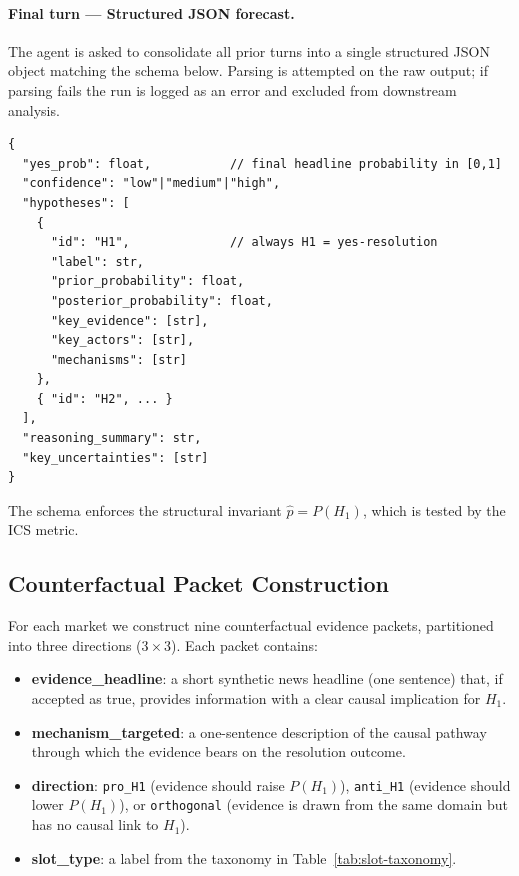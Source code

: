 \paragraph{Final turn --- Structured JSON forecast.}
The agent is asked to consolidate all prior turns into a single structured JSON object matching
the schema below.  Parsing is attempted on the raw output; if parsing fails the run is logged
as an error and excluded from downstream analysis.

\begin{verbatim}
{
  "yes_prob": float,           // final headline probability in [0,1]
  "confidence": "low"|"medium"|"high",
  "hypotheses": [
    {
      "id": "H1",              // always H1 = yes-resolution
      "label": str,
      "prior_probability": float,
      "posterior_probability": float,
      "key_evidence": [str],
      "key_actors": [str],
      "mechanisms": [str]
    },
    { "id": "H2", ... }
  ],
  "reasoning_summary": str,
  "key_uncertainties": [str]
}
\end{verbatim}

The schema enforces the structural invariant $\hat{p} = P(H_1)$, which is tested by the ICS
metric.

\subsection{Counterfactual Packet Construction}
\label{app:cf-taxonomy}

For each market we construct nine counterfactual evidence packets, partitioned into three
directions ($3 \times 3$).  Each packet contains:

\begin{itemize}
  \item \textbf{evidence\_headline}: a short synthetic news headline (one sentence) that, if
        accepted as true, provides information with a clear causal implication for $H_1$.
  \item \textbf{mechanism\_targeted}: a one-sentence description of the causal pathway through
        which the evidence bears on the resolution outcome.
  \item \textbf{direction}: \texttt{pro\_H1} (evidence should raise $P(H_1)$),
        \texttt{anti\_H1} (evidence should lower $P(H_1)$), or \texttt{orthogonal}
        (evidence is drawn from the same domain but has no causal link to $H_1$).
  \item \textbf{slot\_type}: a label from the taxonomy in Table~\ref{tab:slot-taxonomy}.
\end{itemize}

